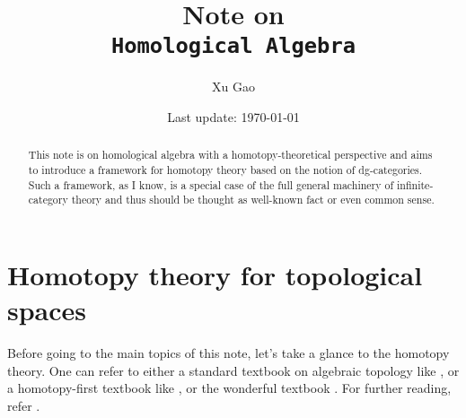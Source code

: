 
	


%
%

%
%
\title{
Note on\\ \texttt{\Huge Homological Algebra}
}
\author{Xu Gao}
\date{
Last update:
\today
}


\maketitle
\begin{abstract}
This note is on homological algebra with a 
homotopy-theoretical perspective and aims to 
introduce a framework for homotopy theory 
based on the notion of dg-categories. 
Such a framework, as I know, is a special case 
of the full general machinery of infinite-category 
theory and thus should be thought as well-known 
fact or even common sense. 
\end{abstract}
\tableofcontents

\clearpage

\section{Homotopy theory for topological spaces}
Before going to the main topics of this note, 
let's take a glance to the homotopy theory. 
One can refer to either a standard textbook on algebraic 
topology like \cite{Hatcher}, or a homotopy-first 
textbook like \cite{ATfromHomotopy}, or the wonderful 
textbook \cite{may1999concise}. 
For further reading, refer \cite{may2012more}.


